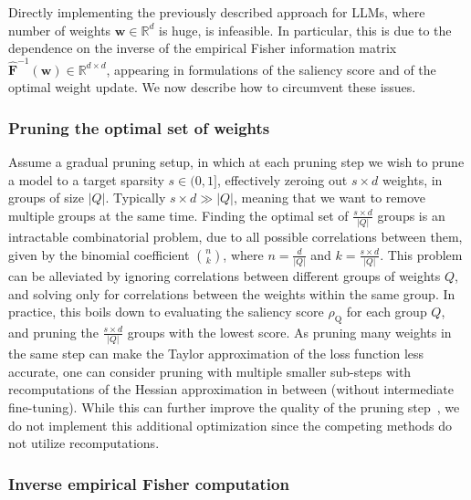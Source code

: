 \documentclass[11pt]{article}
\newcommand{\vect}[1]{\mathbf{#1}}
\newcommand{\w}{\mathbf{w}}
\newcommand{\eF}{\widehat{\vect{F}}}
\newcommand{\subQ}{\textrm{Q}}
\begin{document}
Directly implementing the previously described approach for LLMs, where number of weights $\w \in \mathbb{R}^d$ is huge, is infeasible. In particular, this is due to the dependence on the inverse of the empirical Fisher information matrix $\eF^{-1}(\w) \in \mathbb{R}^{d \times d}$, appearing in formulations of the saliency score and of the optimal weight update. 
We now describe how to circumvent these issues. 

\subsubsection{Pruning the optimal set of weights}

Assume a gradual pruning setup, in which at each pruning step we wish to prune a model to a target sparsity $s \in (0, 1]$, effectively zeroing out $s \times d$ weights, in groups of size $|Q|$. Typically $s \times d \gg |Q|$, meaning that we want to remove multiple groups at the same time. Finding the optimal set of $\frac{s \times d}{|Q|}$ groups is an intractable combinatorial problem, due to all possible correlations between them, given by the binomial coefficient $\binom{n}{k}$, where $n = \frac{d}{|Q|}$ and $k = \frac{s \times d}{|Q|}$. 
This problem can be alleviated by ignoring correlations between different groups of weights $Q$, and solving only for correlations between the weights within the same group. 
In practice, this boils down to evaluating the saliency score $\rho_\subQ$ for each group $Q$, and pruning the $\frac{s \times d}{|Q|}$ groups with the lowest score. 
As pruning many weights in the same step can make the Taylor approximation of the loss function less accurate, one can consider pruning with multiple smaller sub-steps with recomputations of the Hessian approximation in between (without intermediate fine-tuning). 
While this can further improve the quality of the pruning step~\cite{Frantar2021EfficientMA}, we do not implement this additional optimization since the competing methods do not utilize recomputations. 

\subsubsection{Inverse empirical Fisher computation}
\end{document}
